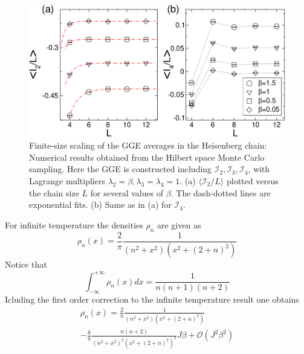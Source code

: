 \documentclass[twocolumn,superscriptaddress,prb,10pt]{revtex4-1}
\begin{document}
\begin{figure}[t]
\includegraphics*[width=0.93\linewidth]{./draft_figs/fig3}
\caption{Finite-size scaling of the GGE averages in the Heisenberg chain: Numerical results 
 obtained from the Hilbert space Monte Carlo sampling. Here the GGE is constructed including 
 ${\mathcal I}_2, {\mathcal I}_3, {\mathcal I}_4$, with Lagrange multipliers $\lambda_2=\beta,
 \lambda_3=\lambda_4=1$. (a) $\langle {\mathcal I}_2/L\rangle$ plotted versus the chain size 
 $L$ for several values of $\beta$. The dash-dotted lines are exponential fits. (b) Same as 
 in (a) for ${\mathcal I}_4$.
}
\label{fig-3}
\end{figure}

For infinite temperature the densities $\rho_n$ are given as 
%
\begin{equation}
\rho_n(x)=\frac{2}{\pi}\frac{1}{(n^2+x^2)(x^2+(2+n)^2)}
\end{equation}
%
Notice that 
%
\begin{equation}
\int_{-\infty}^{+\infty}\rho_n(x) dx=\frac{1}{n(n+1)(n+2)}
\end{equation}
%
Icluding the first order correction to the infinite temperature result 
one obtains  
%
\begin{multline}
\label{high-t-rho}
\rho_n(x)=\frac{2}{\pi}\frac{1}{(n^2+x^2)(x^2+(2+n)^2)}\\-
\frac{8}{\pi}\frac{n(n+2)}{(n^2+x^2)^2(x^2+(2+n)^2)^2}J\beta+{\mathcal O}
(J^2\beta^2)
\end{multline}
%
\end{document}
